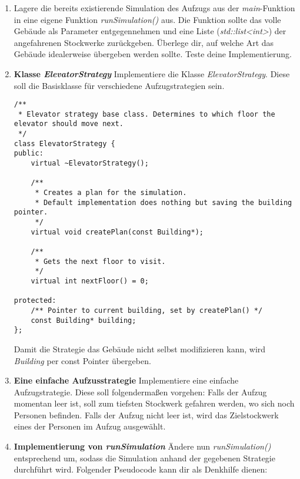\documentclass[
  accentcolor=tud1c,	%
  colorbacktitle,		%
  inverttitle,			%
  german,				%
  twoside
]{tudexercise}
\begin{document}
\begin{enumerate}
\item
Lagere die bereits existierende Simulation des Aufzugs aus der \emph{main}-Funktion in eine eigene Funktion \emph{runSimulation()} aus. Die Funktion sollte das volle Gebäude als Parameter entgegennehmen und eine Liste (\emph{std::list<int>}) der angefahrenen Stockwerke zurückgeben. Überlege dir, auf welche Art das Gebäude idealerweise übergeben werden sollte.
Teste deine Implementierung.

\item \textbf{Klasse \emph{ElevatorStrategy}}
Implementiere die Klasse \emph{ElevatorStrategy}.
Diese soll die Basisklasse für verschiedene Aufzugstrategien sein.

\begin{lstlisting}
/**
 * Elevator strategy base class. Determines to which floor the elevator should move next.
 */
class ElevatorStrategy {
public:
	virtual ~ElevatorStrategy();

	/**
	 * Creates a plan for the simulation. 
	 * Default implementation does nothing but saving the building pointer.
	 */
	virtual void createPlan(const Building*);

	/** 
	 * Gets the next floor to visit.
	 */
	virtual int nextFloor() = 0;

protected:
	/** Pointer to current building, set by createPlan() */
	const Building* building;
};
\end{lstlisting}

Damit die Strategie das Gebäude nicht selbst modifizieren kann, wird \emph{Building} per const Pointer übergeben.

\item \textbf{Eine einfache Aufzusstrategie}
Implementiere eine einfache Aufzugstrategie.
Diese soll folgendermaßen vorgehen: 
Falls der Aufzug momentan leer ist, soll zum tiefsten Stockwerk gefahren werden, wo sich noch Personen befinden.
Falls der Aufzug nicht leer ist, wird das Zielstockwerk eines der Personen im Aufzug ausgewählt.

\item \textbf{Implementierung von \emph{runSimulation}}
Ändere nun \emph{runSimulation()} entsprechend um, sodass die Simulation anhand der gegebenen Strategie durchführt wird.
Folgender Pseudocode kann dir als Denkhilfe dienen: \\
\begin{algorithm}[H]
 \SetAlgoLined
\end{algorithm}
\end{enumerate}
\end{document}
